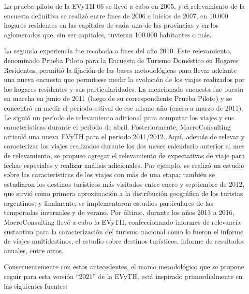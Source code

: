 \documentclass[
  openany]{book}
\begin{document}
La prueba piloto de la EVyTH-06 se llevó a cabo en 2005, y el
relevamiento de la encuesta definitiva se realizó entre fines de 2006 e
inicios de 2007, en 10.000 hogares residentes en las capitales de cada
una de las provincias y en los aglomerados que, sin ser capitales,
tuvieran 100.000 habitantes o más.

La segunda experiencia fue recabada a fines del año 2010. Este
relevamiento, denominado Prueba Piloto para la Encuesta de Turismo
Doméstico en Hogares Residentes, permitió la fijación de las bases
metodológicas para llevar adelante una nueva encuesta que permitiese
medir la evolución de los viajes realizados por los hogares residentes y
sus particularidades. La mencionada encuesta fue puesta en marcha en
junio de 2011 (luego de su correspondiente Prueba Piloto) y se concentró
en medir el período estival de ese mismo año (enero a marzo de 2011). Le
siguió un período de relevamiento adicional para computar los viajes y
sus características durante el periodo de abril. Posteriormente,
MacroConsulting articuló una nueva EVyTH para el periodo 2011/2012.
Aquí, además de relevar y caracterizar los viajes realizados durante los
dos meses calendario anterior al mes de relevamiento, se propuso agregar
el relevamiento de expectativas de viaje para fechas especiales y
realizar análisis adicionales. Por ejemplo, se realizó un estudio sobre
las características de los viajes con más de una etapa; también se
estudiaron los destinos turísticos más visitados entre enero y
septiembre de 2012, que sirvió como primera aproximación a la
distribución geográfica de los turistas argentinos; y finalmente, se
implementaron estudios particulares de las temporadas invernales y de
verano. Por último, durante los años 2013 a 2016, MacroConsulting llevó
a cabo la EVyTH, confeccionando informes de relevancia sustantiva para
la caracterización del turismo nacional como lo fueron el informe de
viajes multidestinos, el estudio sobre destinos turísticos, informe de
resultados anuales, entre otros.

Consecuentemente con estos antecedentes, el marco metodológico que se
propone seguir para esta versión ``2021'' de la EVyTH, está inspirado
primordialmente en las siguientes fuentes:
\end{document}
